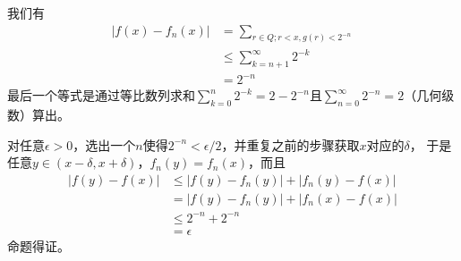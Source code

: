 \documentclass{article}
\begin{document}
我们有
\begin{align*}
      |f(x) - f_n(x)| & = \sum \limits_{r \in Q; r < x, g(r) < 2^{-n}} \\
                      & \leq \sum \limits_{k = n + 1}^\infty 2^{-k}    \\
                      & = 2^{-n}
\end{align*}
最后一个等式是通过等比数列求和$\sum \limits_{k = 0}^n 2^{-k} = 2 - 2^{-n}$且$\sum\limits_{n=0}^\infty 2^{-n} = 2$（几何级数）算出。

对任意$\epsilon > 0$，选出一个$n$使得$2^{-n} < \epsilon / 2$，并重复之前的步骤获取$x$对应的$\delta$，
于是任意$y \in (x - \delta, x + \delta)$，$f_n(y) = f_n(x)$，而且
\begin{align*}
      |f(y) - f(x)| & \leq |f(y) - f_n(y)| + |f_n(y) - f(x)| \\
                    & = |f(y) - f_n(y)| + |f_n(x) - f(x)|    \\
                    & \leq 2^{-n} + 2^{-n}                   \\
                    & = \epsilon
\end{align*}
命题得证。
\end{document}
